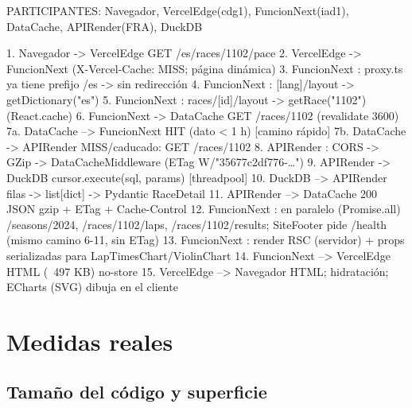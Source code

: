 \begin{codigo}
PARTICIPANTES: Navegador, VercelEdge(cdg1), FuncionNext(iad1), DataCache, APIRender(FRA), DuckDB

1. Navegador      -> VercelEdge     GET /es/races/1102/pace
2. VercelEdge     -> FuncionNext    (X-Vercel-Cache: MISS; página dinámica)
3. FuncionNext    : proxy.ts ya tiene prefijo /es -> sin redirección
4. FuncionNext    : [lang]/layout -> getDictionary("es")
5. FuncionNext    : races/[id]/layout -> getRace("1102") (React.cache)
6. FuncionNext    -> DataCache      GET /races/1102 (revalidate 3600)
7a. DataCache     --> FuncionNext   HIT (dato < 1 h)            [camino rápido]
7b. DataCache     -> APIRender      MISS/caducado: GET /races/1102
8.  APIRender     : CORS -> GZip -> DataCacheMiddleware (ETag W/"35677c2df776-…")
9.  APIRender     -> DuckDB         cursor.execute(sql, params)  [threadpool]
10. DuckDB        --> APIRender     filas -> list[dict] -> Pydantic RaceDetail
11. APIRender     --> DataCache     200 JSON gzip + ETag + Cache-Control
12. FuncionNext   : en paralelo (Promise.all) /seasons/2024, /races/1102/laps, /races/1102/results;
                    SiteFooter pide /health (mismo camino 6-11, sin ETag)
13. FuncionNext   : render RSC (servidor) + props serializadas para LapTimesChart/ViolinChart
14. FuncionNext   --> VercelEdge    HTML (~497 KB) no-store
15. VercelEdge    --> Navegador     HTML; hidratación; ECharts (SVG) dibuja en el cliente
\end{codigo}

\section{Medidas reales}

\subsection{Tamaño del código y superficie}

